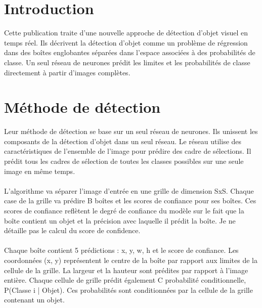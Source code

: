 \documentclass[11pt]{report}
\begin{document}
\section{Introduction}
Cette publication traite d'une nouvelle approche de détection d'objet visuel en temps réel. Ils décrivent la détection d'objet comme un problème de régression dans des boîtes englobantes séparées dans l'espace associées à des probabilités de classe. Un seul réseau de neurones prédit les limites et les probabilités de classe directement à partir d'images complètes.


\section{Méthode de détection}
Leur méthode de détection se base sur un seul réseau de neurones. Ils unissent les composants de la détection d'objet dans un seul réseau. Le réseau utilise des caractéristiques de l'ensemble de l'image pour prédire des cadre de sélections. Il prédit tous les cadres de sélection de toutes les classes possibles sur une seule image en même temps.\\\\
L'algorithme va séparer l'image d'entrée en une grille de dimension SxS. Chaque case de la grille va prédire B boîtes et les scores de confiance pour ses boîtes. Ces scores de confiance reflètent le degré de confiance du modèle sur le fait que la boîte contient un objet et la précision avec laquelle il prédit la boîte.
Je ne détaille pas le calcul du score de confidence.\\\\
Chaque boîte contient 5 prédictions : x, y, w, h et le score de confiance. Les coordonnées (x, y) représentent le centre de la boîte par rapport aux limites de la cellule de la grille. La largeur et la hauteur sont prédites par rapport à l'image entière. Chaque cellule de grille prédit également C probabilité conditionnelle,
P(Classe i | Objet). Ces probabilités sont conditionnées par la cellule de la grille contenant un objet.
\end{document}
